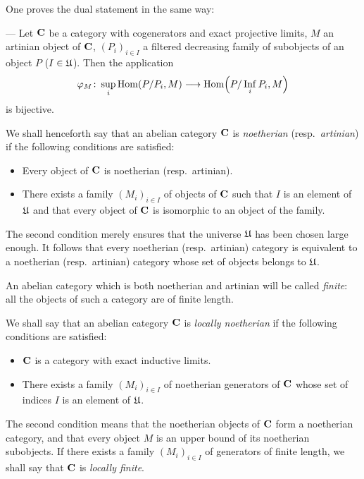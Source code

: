 One proves the dual statement in the same way:

\begin{lemma}
--- Let $\mathbf{C}$ be a category with cogenerators and exact projective limits,
$M$ an artinian object of $\mathbf{C}$, $(P_i)_{i\in I}$ a filtered decreasing
family of subobjects of an object $P$ ($I\in\mathfrak{U}$). Then the application
\[
  \varphi_M\colon \sup_i \operatorname{Hom}(P/P_i,M)
    \longrightarrow \operatorname{Hom}\Bigl(P/\operatorname*{Inf}_i
    P_i,M\Bigr)
\]
is bijective.
\end{lemma}

We shall henceforth say that an abelian category $\mathbf{C}$ is \emph{noetherian}
(resp.\ \emph{artinian}) if the following conditions are satisfied:

\begin{itemize}
\item[---] Every object of $\mathbf{C}$ is noetherian (resp.\ artinian).
\item[---] There exists a family $(M_i)_{i\in I}$ of objects of $\mathbf{C}$ such
      that $I$ is an element of $\mathfrak{U}$ and that every object of $\mathbf{C}$ is
      isomorphic to an object of the family.
\end{itemize}

The second condition merely ensures that the universe $\mathfrak{U}$ has been chosen
large enough. It follows that every noetherian (resp.\ artinian) category is
equivalent to a noetherian (resp.\ artinian) category whose set of objects
belongs to $\mathfrak{U}$.

An abelian category which is both noetherian and artinian will be called
\emph{finite}: all the objects of such a category are of finite length.

We shall say that an abelian category $\mathbf{C}$ is \emph{locally noetherian} if
the following conditions are satisfied:

\begin{itemize}
\item[---] $\mathbf{C}$ is a category with exact inductive limits.
\item[---] There exists a family $(M_i)_{i\in I}$ of noetherian generators
      of $\mathbf{C}$ whose set of indices $I$ is an element of $\mathfrak{U}$.
\end{itemize}

The second condition means that the noetherian objects of $\mathbf{C}$ form a
noetherian category, and that every object $M$ is an upper bound of its
noetherian subobjects. If there exists a family $(M_i)_{i\in I}$ of
generators of finite length, we shall say that $\mathbf{C}$ is \emph{locally
finite}.

